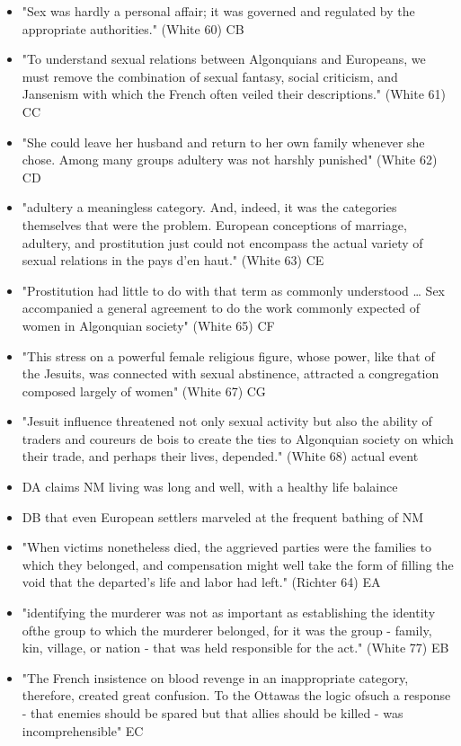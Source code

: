 \documentclass[letterpaper]{article}
\begin{document}
\begin{itemize}
\item "Sex was hardly a personal affair; it was governed and regulated by the appropriate authorities." (White 60) CB
\item "To understand sexual relations between Algonquians and Europeans, we must remove the combination of sexual fantasy, social criticism, and Jansenism with which the French often veiled their descriptions." (White 61) CC
\item "She could leave her husband and return to her own family whenever she chose. Among many groups adultery was not harshly punished" (White 62) CD
\item "adultery a meaningless category. And, indeed, it was the categories themselves that were the problem. European conceptions of marriage, adultery, and prostitution just could not encompass the actual variety of sexual relations in the pays d'en haut." (White 63) CE
\item "Prostitution had little to do with that term as commonly understood \ldots{} Sex accompanied a general agreement to do the work commonly expected of women in Algonquian society" (White 65) CF
\item "This stress on a powerful female religious figure, whose power, like that of the Jesuits, was connected with sexual abstinence, attracted a congregation composed largely of women" (White 67) CG
\item "Jesuit influence threatened not only sexual activity but also the ability of traders and coureurs de bois to create the ties to Algonquian society on which their trade, and perhaps their lives, depended." (White 68) actual event
\item DA claims NM living was long and well, with a healthy life balaince
\item DB that even European settlers marveled at the frequent bathing of NM
\item "When victims nonetheless died, the aggrieved parties were the families to which they belonged, and compensation might well take the form of filling the void that the departed’s life and labor had left." (Richter 64) EA
\item "identifying the murderer was not as important as establishing the identity ofthe group to which the murderer belonged, for it was the group - family, kin, village, or nation - that was held responsible for the act." (White 77) EB
\item "The French insistence on blood revenge in an inappropriate category, therefore, created great confusion. To the Ottawas the logic ofsuch a response - that enemies should be spared but that allies should be killed - was incomprehensible" EC
\end{itemize}
\end{document}
